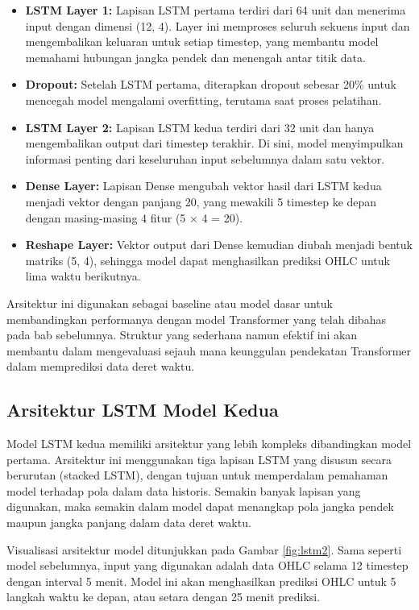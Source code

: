 \begin{itemize}
    \item \textbf{LSTM Layer 1:} Lapisan LSTM pertama terdiri dari 64 unit dan menerima input dengan dimensi (12, 4). Layer ini memproses seluruh sekuens input dan mengembalikan keluaran untuk setiap timestep, yang membantu model memahami hubungan jangka pendek dan menengah antar titik data.
    
    \item \textbf{Dropout:} Setelah LSTM pertama, diterapkan dropout sebesar 20\% untuk mencegah model mengalami overfitting, terutama saat proses pelatihan.
    
    \item \textbf{LSTM Layer 2:} Lapisan LSTM kedua terdiri dari 32 unit dan hanya mengembalikan output dari timestep terakhir. Di sini, model menyimpulkan informasi penting dari keseluruhan input sebelumnya dalam satu vektor.
    
    \item \textbf{Dense Layer:} Lapisan Dense mengubah vektor hasil dari LSTM kedua menjadi vektor dengan panjang 20, yang mewakili 5 timestep ke depan dengan masing-masing 4 fitur (5 × 4 = 20).
    
    \item \textbf{Reshape Layer:} Vektor output dari Dense kemudian diubah menjadi bentuk matriks (5, 4), sehingga model dapat menghasilkan prediksi OHLC untuk lima waktu berikutnya.
\end{itemize}

Arsitektur ini digunakan sebagai baseline atau model dasar untuk membandingkan performanya dengan model Transformer yang telah dibahas pada bab sebelumnya. Struktur yang sederhana namun efektif ini akan membantu dalam mengevaluasi sejauh mana keunggulan pendekatan Transformer dalam memprediksi data deret waktu.

\subsection{Arsitektur LSTM Model Kedua}
Model LSTM kedua memiliki arsitektur yang lebih kompleks dibandingkan model pertama. Arsitektur ini menggunakan tiga lapisan LSTM yang disusun secara berurutan (stacked LSTM), dengan tujuan untuk memperdalam pemahaman model terhadap pola dalam data historis. Semakin banyak lapisan yang digunakan, maka semakin dalam model dapat menangkap pola jangka pendek maupun jangka panjang dalam data deret waktu.

Visualisasi arsitektur model ditunjukkan pada Gambar \ref{fig:lstm2}. Sama seperti model sebelumnya, input yang digunakan adalah data OHLC selama 12 timestep dengan interval 5 menit. Model ini akan menghasilkan prediksi OHLC untuk 5 langkah waktu ke depan, atau setara dengan 25 menit prediksi.

